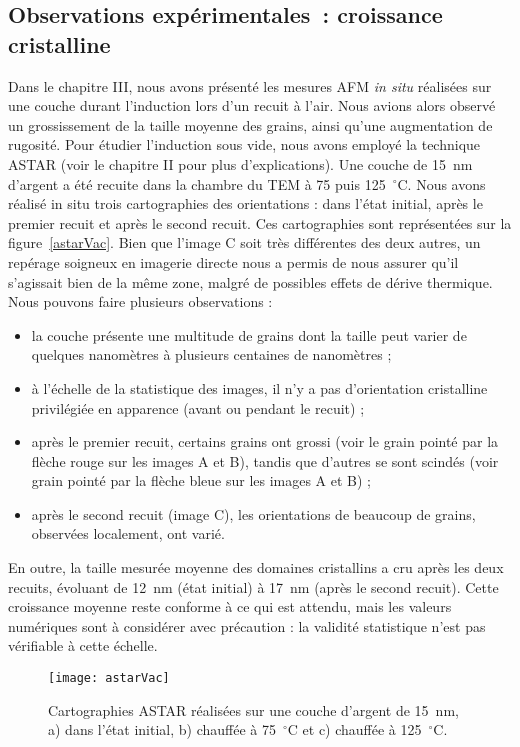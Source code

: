 		\subsection{Observations expérimentales~: croissance cristalline}
Dans le chapitre III, nous avons présenté les mesures AFM \textit{in situ} réalisées sur une couche durant l’induction lors d’un recuit à l’air. Nous avions alors observé un grossissement de la taille moyenne des grains, ainsi qu’une augmentation de rugosité. Pour étudier l’induction sous vide, nous avons employé la technique ASTAR (voir le chapitre II pour plus d’explications). Une couche de 15~nm d’argent a été recuite dans la chambre du TEM à 75 puis 125~$^\circ$C. Nous avons réalisé in situ trois cartographies des orientations : dans l’état initial, après le premier recuit et après le second recuit. Ces cartographies sont représentées sur la figure~\ref{astarVac}. Bien que l’image C soit très différentes des deux autres, un repérage soigneux en imagerie directe nous a permis de nous assurer qu’il s’agissait bien de la même zone, malgré de possibles effets de dérive thermique. Nous pouvons faire plusieurs observations :
\begin{itemize}
\item la couche présente une multitude de grains dont la taille peut varier de quelques nanomètres à plusieurs centaines de nanomètres ;
\item à l'échelle de la statistique des images, il n’y a pas d’orientation cristalline privilégiée en apparence (avant ou pendant le recuit) ;
\item après le premier recuit, certains grains ont grossi (voir le grain pointé par la flèche rouge sur les images A et B), tandis que d’autres se sont scindés (voir grain pointé par la flèche bleue sur les images A et B) ;
\item après le second recuit (image C), les orientations de beaucoup de grains, observées localement, ont varié.
\end{itemize}
En outre, la taille mesurée moyenne des domaines cristallins a cru après les deux recuits, évoluant de 12~nm (état initial) à 17~nm (après le second recuit). Cette croissance moyenne reste conforme à ce qui est attendu, mais les valeurs numériques sont à considérer avec précaution : la validité statistique n’est pas vérifiable à cette échelle.\par 
\begin{figure}[!htb]
\centering
\texttt{[image: astarVac]}
\caption{Cartographies ASTAR réalisées sur une couche d’argent de 15~nm, a) dans l’état initial, b) chauffée à 75~$^\circ$C et c) chauffée à 125~$^\circ$C.}
\label{AFMcomparaison}
\end{figure}
